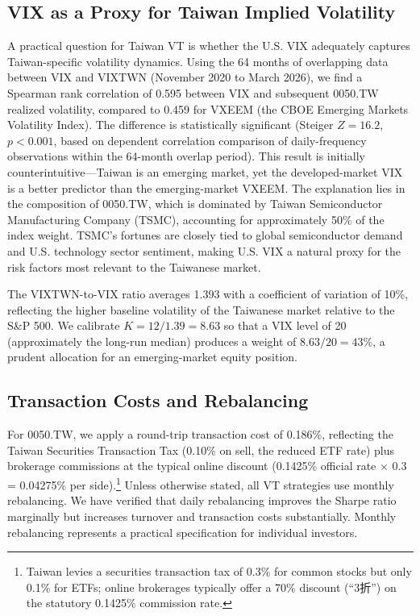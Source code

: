 \subsection{VIX as a Proxy for Taiwan Implied Volatility}

A practical question for Taiwan VT is whether the U.S. VIX adequately captures Taiwan-specific volatility dynamics. Using the 64 months of overlapping data between VIX and VIXTWN (November 2020 to March 2026), we find a Spearman rank correlation of 0.595 between VIX and subsequent 0050.TW realized volatility, compared to 0.459 for VXEEM (the CBOE Emerging Markets Volatility Index). The difference is statistically significant (Steiger $Z = 16.2$, $p < 0.001$, based on dependent correlation comparison of daily-frequency observations within the 64-month overlap period). This result is initially counterintuitive---Taiwan is an emerging market, yet the developed-market VIX is a better predictor than the emerging-market VXEEM. The explanation lies in the composition of 0050.TW, which is dominated by Taiwan Semiconductor Manufacturing Company (TSMC), accounting for approximately 50\% of the index weight. TSMC's fortunes are closely tied to global semiconductor demand and U.S. technology sector sentiment, making U.S. VIX a natural proxy for the risk factors most relevant to the Taiwanese market.

The VIXTWN-to-VIX ratio averages 1.393 with a coefficient of variation of 10\%, reflecting the higher baseline volatility of the Taiwanese market relative to the S\&P 500. We calibrate $K = 12 / 1.39 = 8.63$ so that a VIX level of 20 (approximately the long-run median) produces a weight of $8.63/20 = 43\%$, a prudent allocation for an emerging-market equity position.

\subsection{Transaction Costs and Rebalancing}

For 0050.TW, we apply a round-trip transaction cost of 0.186\%, reflecting the Taiwan Securities Transaction Tax (0.10\% on sell, the reduced ETF rate) plus brokerage commissions at the typical online discount (0.1425\% official rate $\times$ 0.3 = 0.04275\% per side).\footnote{Taiwan levies a securities transaction tax of 0.3\% for common stocks but only 0.1\% for ETFs; online brokerages typically offer a 70\% discount (``3折'') on the statutory 0.1425\% commission rate.} Unless otherwise stated, all VT strategies use monthly rebalancing. We have verified that daily rebalancing improves the Sharpe ratio marginally but increases turnover and transaction costs substantially. Monthly rebalancing represents a practical specification for individual investors.


